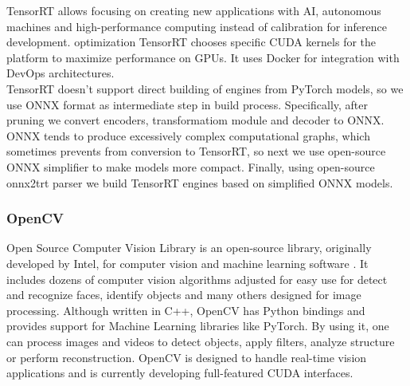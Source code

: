 \documentclass[../Main.tex]{subfiles}
\begin{document}
    TensorRT allows focusing on creating new applications with AI, autonomous machines
    and high-performance computing instead of calibration for inference development.
     optimization TensorRT chooses specific CUDA kernels for the platform to maximize
    performance on GPUs. It uses Docker for integration with DevOps architectures.\\
    TensorRT doesn't support direct building of engines from PyTorch models, so 
    we use ONNX format as intermediate step in build process. Specifically, after
    pruning we convert encoders, transformatiom module and decoder to ONNX. 
    ONNX tends to produce excessively complex computational graphs, which sometimes
    prevents from conversion to TensorRT, so next we use open-source ONNX simplifier 
    \cite{onnxsim} to make models more compact. Finally, using open-source
    onnx2trt parser \cite{onnx2trt} we build TensorRT engines based on simplified
    ONNX models.
    

    \subsubsection{OpenCV}
    Open Source Computer Vision Library is an open-source library, originally developed by Intel, for computer vision and machine learning software \cite{opencvdocs}. It includes dozens of computer vision algorithms adjusted for easy use for detect and recognize faces, identify objects and many others designed for image processing. Although written in C++, OpenCV has Python bindings and provides support for Machine Learning libraries like PyTorch.  By using it, one can process images and videos to detect objects, apply filters, analyze structure or perform reconstruction. OpenCV is designed to handle real-time vision applications and is currently developing full-featured CUDA interfaces.
\end{document}
